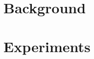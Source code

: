 \documentclass[12pt,a4paper]{article}
\numberwithin{figure}{section}
\numberwithin{table}{section}
\numberwithin{algorithm}{section}
\begin{document}
\part{Background}









%

\part{Experiments}



%










%


\end{document}
